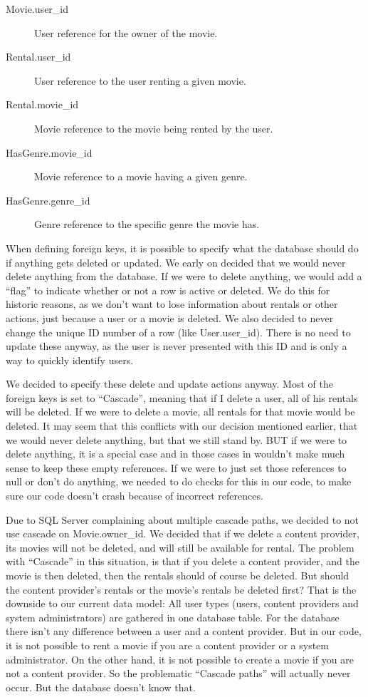 \begin{description}
\item[Movie.user_id] User reference for the owner of the movie.
\item[Rental.user_id] User reference to the user renting a given movie.
\item[Rental.movie_id] Movie reference to the movie being rented by the user.
\item[HasGenre.movie_id] Movie reference to a movie having a given genre.
\item[HasGenre.genre_id] Genre reference to the specific genre the movie has.
\end{description}

When defining foreign keys, it is possible to specify what the database should do if anything gets deleted or updated. We early on decided that we would never delete anything from the database. If we were to delete anything, we would add a ``flag'' to indicate whether or not a row is active or deleted. We do this for historic reasons, as we don't want to lose information about rentals or other actions, just because a user or a movie is deleted.
We also decided to never change the unique ID number of a row (like User.user_id). There is no need to update these anyway, as the user is never presented with this ID and is only a way to quickly identify users.

We decided to specify these delete and update actions anyway. Most of the foreign keys is set to ``Cascade'', meaning that if I delete a user, all of his rentals will be deleted. If we were to delete a movie, all rentals for that movie would be deleted. It may seem that this conflicts with our decision mentioned earlier, that we would never delete anything, but that we still stand by. BUT if we were to delete anything, it is a special case and in those cases in wouldn't make much sense to keep these empty references. If we were to just set those references to null or don't do anything, we needed to do checks for this in our code, to make sure our code doesn't crash because of incorrect references.

Due to SQL Server complaining about multiple cascade paths, we decided to not use cascade on Movie.owner_id. We decided that if we delete a content provider, its movies will not be deleted, and will still be available for rental. The problem with ``Cascade'' in this situation, is that if you delete a content provider, and the movie is then deleted, then the rentals should of course be deleted. But should the content provider's rentals or the movie's rentals be deleted first?
That is the downside to our current data model: All user types (users, content providers and system administrators) are gathered in one database table. For the database there isn't any difference between a user and a content provider. But in our code, it is not possible to rent a movie if you are a content provider or a system administrator. On the other hand, it is not possible to create a movie if you are not a content provider. So the problematic ``Cascade paths'' will actually never occur. But the database doesn't know that.

